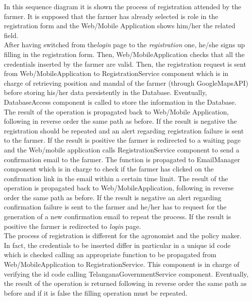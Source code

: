In this sequence diagram it is shown the process of registration attended by the farmer. It is supposed that the farmer has already selected is role in the registration form and the Web/Mobile Application shows him/her the related field.\\ 
After having switched from the\textit{login} page to the \textit{registration} one, he/she signs up filling in the registration form. Then, Web/MobileApplication checks that all the credentials inserted by the farmer are valid. Then, the registration request is sent from Web/MobileApplication to RegistrationService component which is in charge of retrieving position and mandal of the farmer (through GoogleMapsAPI) before storing his/her data persistently in the Database. Eventually, DatabaseAccess component is called to store the information in the Database. The result of the operation is propagated back to Web/Mobile Application, following in reverse order the same path as before. If the result is negative the registration should be repeated and an alert regarding registration failure is sent to the farmer. If the result is positive the farmer is redirected to a waiting page and the Web/mobile application calls RegistrationService component to send a confirmation email to the farmer. The function is propagated to EmailManager component which is in charge to check if the farmer has clicked on the confirmation link in the email within a certain time limit. The result of the operation is propagated back to Web/MobileApplication, following in reverse order the same path as before. If the result is negative an alert regarding confirmation failure is sent to the farmer and he/her has to request for the generation of a new confirmation email to repeat the process. If the result is positive the farmer is redirected to \textit{login} page.\\
The process of registration is different for the agronomist and the policy maker. In fact, the credentials to be inserted differ in particular in a unique id code which is checked calling an appropriate function to be propagated from Web/MobileApplication to RegistrationService. This component is in charge of verifying the id code calling TelanganaGovernmentService component. Eventually, the result of the operation is returned following in reverse order the same path as before and if it is false the filling operation must be repeated. 

